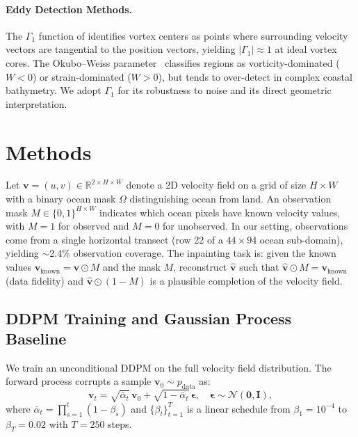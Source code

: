 \documentclass{article}
\begin{document}
\paragraph{Eddy Detection Methods.}
The $\Gamma_1$ function of \citet{graftieaux2001combining} identifies vortex centers as points where surrounding velocity vectors are tangential to the position vectors, yielding $|\Gamma_1| \approx 1$ at ideal vortex cores. The Okubo--Weiss parameter~\citep{okubo1970horizontal, weiss1991dynamics} classifies regions as vorticity-dominated ($W < 0$) or strain-dominated ($W > 0$), but tends to over-detect in complex coastal bathymetry. We adopt $\Gamma_1$ for its robustness to noise and its direct geometric interpretation.

\section{Methods}
\label{sec:methods}

Let $\mathbf{v} = (u, v) \in \mathbb{R}^{2 \times H \times W}$ denote a 2D velocity field on a grid of size $H \times W$ with a binary ocean mask $\Omega$ distinguishing ocean from land. An observation mask $M \in \{0,1\}^{H \times W}$ indicates which ocean pixels have known velocity values, with $M = 1$ for observed and $M = 0$ for unobserved. In our setting, observations come from a single horizontal transect (row 22 of a $44 \times 94$ ocean sub-domain), yielding $\sim$2.4\% observation coverage. The inpainting task is: given the known values $\mathbf{v}_{\text{known}} = \mathbf{v} \odot M$ and the mask $M$, reconstruct $\hat{\mathbf{v}}$ such that $\hat{\mathbf{v}} \odot M = \mathbf{v}_{\text{known}}$ (data fidelity) and $\hat{\mathbf{v}} \odot (1 - M)$ is a plausible completion of the velocity field.

\subsection{DDPM Training and Gaussian Process Baseline}
\label{sec:ddpm_gp}

We train an unconditional DDPM on the full velocity field distribution. The forward process corrupts a sample $\mathbf{v}_0  \sim p_{\text{data}}$ as:
\begin{equation}
    \mathbf{v}_t = \sqrt{\bar\alpha_t}\, \mathbf{v}_0 + \sqrt{1 - \bar\alpha_t}\, \boldsymbol{\epsilon}, \quad \boldsymbol{\epsilon} \sim \mathcal{N}(\mathbf{0}, \mathbf{I}),
    \label{eq:forward}
\end{equation}
where $\bar\alpha_t = \prod_{s=1}^t (1 - \beta_s)$ and $\{\beta_t\}_{t=1}^T$ is a linear schedule from $\beta_1 = 10^{-4}$ to $\beta_T = 0.02$ with $T = 250$ steps.
\end{document}
